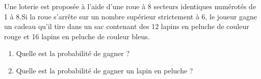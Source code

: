 
Une loterie est proposée à l'aide d'une roue à 8 secteurs identiques numérotés de 1 à 8.Si la roue s'arrête sur un nombre supérieur strictement à 6, le joueur gagne un cadeau qu'il tire dans un sac contenant des 12 lapins en peluche de couleur rouge et 16 lapins en peluche de couleur bleus.
\begin{enumerate}
\item Quelle est la probabilité de gagner ?
\item Quelle est la probabilité de gagner un lapin en peluche ?
\end{enumerate}